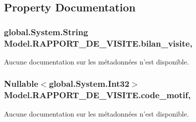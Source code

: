 \subsection{Property Documentation}
\hypertarget{class_model_1_1_r_a_p_p_o_r_t___d_e___v_i_s_i_t_e_a916f42e4c755e24452e9037997dfbb35}{
\subsubsection[{bilan\-\_\-visite}]{\setlength{\rightskip}{0pt plus 5cm}global.\-System.\-String Model.\-R\-A\-P\-P\-O\-R\-T\-\_\-\-D\-E\-\_\-\-V\-I\-S\-I\-T\-E.\-bilan\-\_\-visite\hspace{0.3cm}{\ttfamily [get]}, {\ttfamily [set]}}}\label{class_model_1_1_r_a_p_p_o_r_t___d_e___v_i_s_i_t_e_a916f42e4c755e24452e9037997dfbb35}


Aucune documentation sur les métadonnées n'est disponible. 

\hypertarget{class_model_1_1_r_a_p_p_o_r_t___d_e___v_i_s_i_t_e_a57873cda816b38fbd05d2e659fb45c35}{
\subsubsection[{code\-\_\-motif}]{\setlength{\rightskip}{0pt plus 5cm}Nullable$<$global.\-System.\-Int32$>$ Model.\-R\-A\-P\-P\-O\-R\-T\-\_\-\-D\-E\-\_\-\-V\-I\-S\-I\-T\-E.\-code\-\_\-motif\hspace{0.3cm}{\ttfamily [get]}, {\ttfamily [set]}}}\label{class_model_1_1_r_a_p_p_o_r_t___d_e___v_i_s_i_t_e_a57873cda816b38fbd05d2e659fb45c35}


Aucune documentation sur les métadonnées n'est disponible. 

